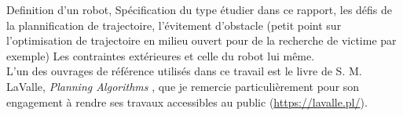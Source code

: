 \documentclass[../main.tex]{subfiles}
\begin{document}
Definition d'un robot,
Spécification du type étudier dans ce rapport,
les défis de la plannification de trajectoire,
l'évitement d'obstacle (petit point sur l'optimisation de trajectoire en milieu ouvert pour de la recherche de victime par exemple)
Les contraintes extérieures et celle du robot lui même.\\

L'un des ouvrages de référence utilisés dans ce travail est le livre de S. M. LaValle, \textit{Planning Algorithms} \cite{Lavalle_2006}, que je remercie particulièrement pour son engagement à rendre ses travaux accessibles au public ({\scriptsize \url{https://lavalle.pl/}}).
\end{document}
